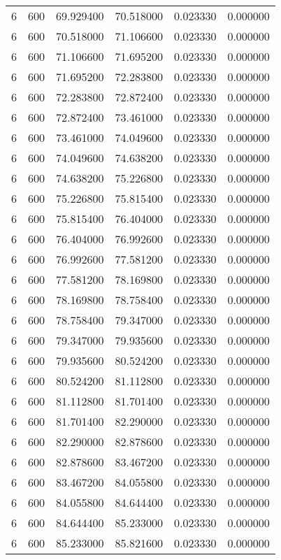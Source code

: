 \begin{longtable}{rrrrrr}
6 & 600 & 69.929400 & 70.518000 & 0.023330 & 0.000000 \\
6 & 600 & 70.518000 & 71.106600 & 0.023330 & 0.000000 \\
6 & 600 & 71.106600 & 71.695200 & 0.023330 & 0.000000 \\
6 & 600 & 71.695200 & 72.283800 & 0.023330 & 0.000000 \\
6 & 600 & 72.283800 & 72.872400 & 0.023330 & 0.000000 \\
6 & 600 & 72.872400 & 73.461000 & 0.023330 & 0.000000 \\
6 & 600 & 73.461000 & 74.049600 & 0.023330 & 0.000000 \\
6 & 600 & 74.049600 & 74.638200 & 0.023330 & 0.000000 \\
6 & 600 & 74.638200 & 75.226800 & 0.023330 & 0.000000 \\
6 & 600 & 75.226800 & 75.815400 & 0.023330 & 0.000000 \\
6 & 600 & 75.815400 & 76.404000 & 0.023330 & 0.000000 \\
6 & 600 & 76.404000 & 76.992600 & 0.023330 & 0.000000 \\
6 & 600 & 76.992600 & 77.581200 & 0.023330 & 0.000000 \\
6 & 600 & 77.581200 & 78.169800 & 0.023330 & 0.000000 \\
6 & 600 & 78.169800 & 78.758400 & 0.023330 & 0.000000 \\
6 & 600 & 78.758400 & 79.347000 & 0.023330 & 0.000000 \\
6 & 600 & 79.347000 & 79.935600 & 0.023330 & 0.000000 \\
6 & 600 & 79.935600 & 80.524200 & 0.023330 & 0.000000 \\
6 & 600 & 80.524200 & 81.112800 & 0.023330 & 0.000000 \\
6 & 600 & 81.112800 & 81.701400 & 0.023330 & 0.000000 \\
6 & 600 & 81.701400 & 82.290000 & 0.023330 & 0.000000 \\
6 & 600 & 82.290000 & 82.878600 & 0.023330 & 0.000000 \\
6 & 600 & 82.878600 & 83.467200 & 0.023330 & 0.000000 \\
6 & 600 & 83.467200 & 84.055800 & 0.023330 & 0.000000 \\
6 & 600 & 84.055800 & 84.644400 & 0.023330 & 0.000000 \\
6 & 600 & 84.644400 & 85.233000 & 0.023330 & 0.000000 \\
6 & 600 & 85.233000 & 85.821600 & 0.023330 & 0.000000 \\

\end{longtable}
